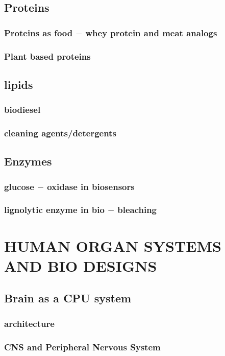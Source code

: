 \documentclass{article}
\begin{document}
	\subsection{Proteins}
	\subsubsection{Proteins as food $-$ whey protein and meat analogs}
	\subsubsection{Plant based proteins}

	\subsection{lipids}
	\subsubsection{biodiesel}
	\subsubsection{cleaning agents/detergents}

	\subsection{Enzymes}
	\subsubsection{glucose $-$ oxidase in biosensors}
	\subsubsection{lignolytic enzyme in bio $-$ bleaching}
	\newpage

	\section{HUMAN ORGAN SYSTEMS AND BIO DESIGNS}
	\subsection{Brain as a CPU system}
	\subsubsection{architecture}
	\subsubsection{CNS and Peripheral Nervous System}
\end{document}
